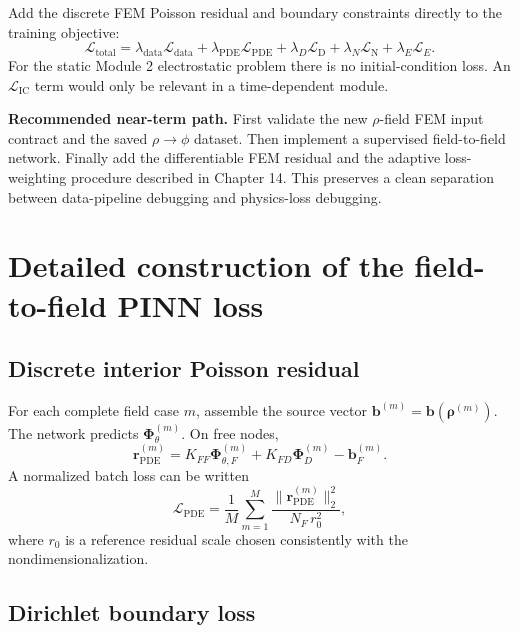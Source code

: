 \documentclass[11pt]{article}
\newcommand{\Ldata}{\mathcal{L}_{\mathrm{data}}}
\newcommand{\Lpde}{\mathcal{L}_{\mathrm{PDE}}}
\newcommand{\Ldir}{\mathcal{L}_{\mathrm{D}}}
\newcommand{\Lneu}{\mathcal{L}_{\mathrm{N}}}
\newcommand{\LE}{\mathcal{L}_{E}}
\newcommand{\Ltot}{\mathcal{L}_{\mathrm{total}}}
\begin{document}
Add the discrete FEM Poisson residual and boundary constraints directly to the training objective:
\begin{equation}
\Ltot
=\lambda_{\mathrm{data}}\Ldata
+\lambda_{\mathrm{PDE}}\Lpde
+\lambda_D\Ldir
+\lambda_N\Lneu
+\lambda_E\LE.
\label{eq:field_total_loss}
\end{equation}
For the static Module 2 electrostatic problem there is no initial-condition loss. An $\mathcal{L}_{\mathrm{IC}}$ term would only be relevant in a time-dependent module.

\begin{physicsbox}
\textbf{Recommended near-term path.} First validate the new $\rho$-field FEM input contract and the saved $\rho\rightarrow\phi$ dataset. Then implement a supervised field-to-field network. Finally add the differentiable FEM residual and the adaptive loss-weighting procedure described in Chapter 14. This preserves a clean separation between data-pipeline debugging and physics-loss debugging.
\end{physicsbox}

\section{Detailed construction of the field-to-field PINN loss}

\subsection{Discrete interior Poisson residual}

For each complete field case $m$, assemble the source vector $\bm{b}^{(m)}=\bm{b}(\bm{\rho}^{(m)})$. The network predicts $\bm{\Phi}_{\theta}^{(m)}$. On free nodes,
\begin{equation}
\bm{r}_{\mathrm{PDE}}^{(m)}
=K_{FF}\bm{\Phi}_{\theta,F}^{(m)}
+K_{FD}\bm{\Phi}_D^{(m)}
-\bm{b}_F^{(m)}.
\end{equation}
A normalized batch loss can be written
\begin{equation}
\Lpde=\frac{1}{M}\sum_{m=1}^{M}
\frac{\|\bm{r}_{\mathrm{PDE}}^{(m)}\|_2^2}
{N_F\,r_0^2},
\label{eq:field_pde_loss_norm}
\end{equation}
where $r_0$ is a reference residual scale chosen consistently with the nondimensionalization.

\subsection{Dirichlet boundary loss}
\end{document}
